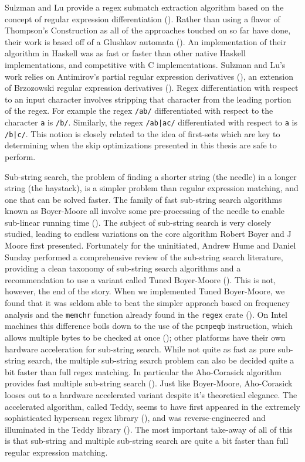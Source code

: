 Sulzman and Lu provide a regex submatch extraction algorithm
based on the concept of regular expression differentiation
(\cite{Sulzmann2012}). Rather than using a flavor of Thompson's
Construction as all of the approaches touched on so far have done,
their work is based off of a Glushkov automata (\cite{Allauzen2006}).
An implementation of their algorithm in Haskell was as fast or
faster than other native Haskell implementations, and competitive
with C implementations. Sulzman and Lu's work relies on
Antimirov's partial regular expression derivatives (\cite{Antimirov1996}),
an extension of Brzozowski regular expression derivatives
(\cite{Brzozowski1964}). Regex differentiation with respect
to an input character involves stripping that character from
the leading portion of the regex. For example the regex \verb'/ab/'
differentiated with respect to the character \verb'a' is \verb'/b/'.
Similarly, the regex \verb'/ab|ac/' differentiated with respect to
\verb'a' is \verb'/b|c/'. This notion is closely related to the
idea of first-sets which are key to determining when
the skip optimizations presented in this thesis are safe to perform.

Sub-string search, the problem of finding a shorter string (the needle) in
a longer string (the haystack), is a simpler problem than regular expression
matching, and one that can be solved faster. The family of fast sub-string
search algorithms known as Boyer-Moore all involve some pre-processing of
the needle to enable sub-linear running time (\cite{Boyer1977}).
The subject of sub-string search is very closely studied, leading to
endless variations on the core algorithm Robert Boyer and J Moore
first presented. Fortunately for the uninitiated, Andrew Hume and
Daniel Sunday performed a comprehensive review of the sub-string search
literature, providing a clean taxonomy of sub-string search algorithms
and a recommendation to use a variant called Tuned Boyer-Moore
(\cite{Hume1991}). This is not, however, the end of the story.
When we implemented Tuned Boyer-Moore, we found that it was seldom
able to beat the simpler approach based on frequency analysis and
the \verb'memchr' function already found in the \verb'regex' crate
(\cite{GallantRegex}). On Intel machines this difference boils down
to the use of the \verb'pcmpeqb' instruction, which allows multiple
bytes to be checked at once (\cite{IntelInstructionManual}); other
platforms have their own hardware acceleration for sub-string search. 
While not quite as fast as pure sub-string search, the multiple
sub-string search problem can also be decided quite a bit faster than
full regex matching. In particular the Aho-Corasick algorithm provides
fast multiple sub-string search (\cite{Aho1975}). Just like Boyer-Moore,
Aho-Corasick looses out to a hardware accelerated variant despite it's
theoretical elegance. The accelerated algorithm, called Teddy, seems
to have first appeared in the extremely sophisticated
hyperscan regex library (\cite{hyperscan}), and was reverse-engineered
and illuminated in the Teddy library (\cite{Teddy}). The most important
take-away of all of this is that sub-string and multiple sub-string
search are quite a bit faster than full regular expression matching.

